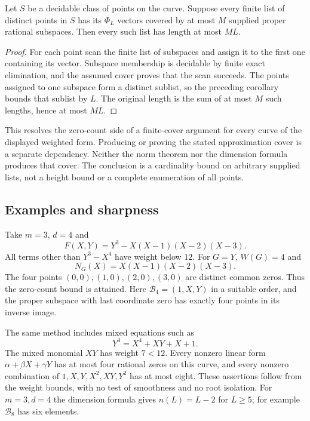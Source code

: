 \begin{corollary}\label{cor:weighted-cover}
Let $S$ be a decidable class of points on the curve.  Suppose every
finite list of distinct points in $S$ has its $\Phi_L$ vectors covered
by at most $M$ supplied proper rational subspaces.  Then every such list
has length at most $ML$.
\end{corollary}

\begin{proof}
For each point scan the finite list of subspaces and assign it to the
first one containing its vector.  Subspace membership is decidable by
finite exact elimination, and the assumed cover proves that the scan
succeeds.  The points assigned to one subspace form a distinct sublist,
so the preceding corollary bounds that sublist by $L$.  The original
length is the sum of at most $M$ such lengths, hence at most $ML$.
\end{proof}

This resolves the zero-count side of a finite-cover argument for every
curve of the displayed weighted form.  Producing or proving the stated
approximation cover is a separate dependency.  Neither the norm theorem
nor the dimension formula produces that cover.  The conclusion is a
cardinality bound on arbitrary supplied lists, not a height bound or a
complete enumeration of all points.

\subsection{Examples and sharpness}

Take $m=3$, $d=4$ and
\[
 F(X,Y)=Y^3-X(X-1)(X-2)(X-3).
\]
All terms other than $Y^3-X^4$ have weight below $12$.  For $G=Y$,
$W(G)=4$ and
\[
 N_G(X)=X(X-1)(X-2)(X-3).
\]
The four points $(0,0),(1,0),(2,0),(3,0)$ are distinct common zeros.
Thus the zero-count bound is attained.  Here
$\mathcal B_4=(1,X,Y)$ in a suitable order, and the proper subspace
with last coordinate zero has exactly four points in its inverse image.

The same method includes mixed equations such as
\[
 Y^3=X^4+XY+X+1.
\]
The mixed monomial $XY$ has weight $7<12$.  Every nonzero linear form
$\alpha+\beta X+\gamma Y$ has at most four rational zeros on this
curve, and every nonzero combination of
$1,X,Y,X^2,XY,Y^2$ has at most eight.  These assertions follow from the
weight bounds, with no test of smoothness and no root isolation.
For $m=3,d=4$ the dimension formula gives $n(L)=L-2$ for $L\ge5$;
for example $\mathcal B_8$ has six elements.

